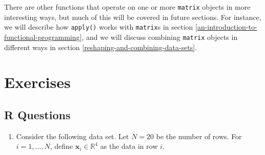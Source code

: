\documentclass[
  12pt,
  krantz2]{krantz}
\providecommand{\tightlist}{%
  \setlength{\itemsep}{0pt}\setlength{\parskip}{0pt}}
\begin{document}
There are other functions that operate on one or more \texttt{matrix} objects in more interesting ways, but much of this will be covered in future sections. For instance, we will describe how \texttt{apply()} works with \texttt{matrix}s in section \ref{an-introduction-to-functional-programming}, and we will discuss combining \texttt{matrix} objects in different ways in section \ref{reshaping-and-combining-data-sets}.

\hypertarget{exercises-2}{%
\section{Exercises}\label{exercises-2}}

\hypertarget{r-questions-2}{%
\subsection{R Questions}\label{r-questions-2}}

\begin{enumerate}
\def\labelenumi{\arabic{enumi}.}
\tightlist
\item
  Consider the following data set. Let \(N = 20\) be the number of rows. For \(i=1,\ldots,N\), define \(\mathbf{x}_i \in \mathbb{R}^4\) as the data in row \(i\).
\end{enumerate}
\end{document}
